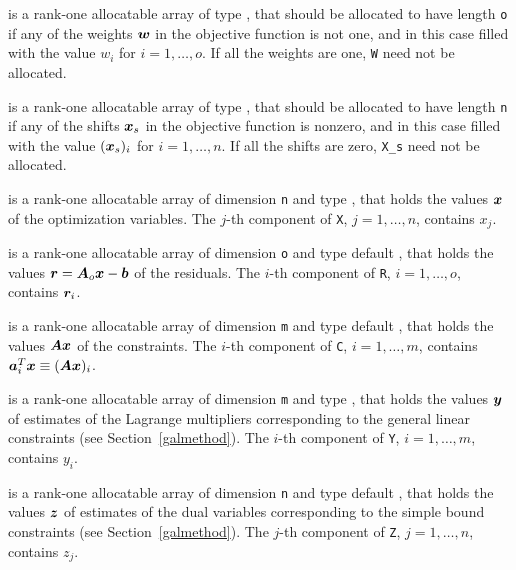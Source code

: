 \documentclass{galahad}
\begin{document}
\begin{description}
 is a rank-one allocatable array of type \realdp, that should
be allocated to have length {\tt o} if any of the weights ${\bm{w}}$
in the objective function is not one, and in this case
filled with the value $w_{i}$ for $i = 1, \ldots , o$.
If all the weights are one, {\tt W} need not be allocated.

 is a rank-one allocatable array of type \realdp, that should
be allocated to have length {\tt n} if any of the shifts ${\bm{x}}_s$
in the objective function is nonzero, and in this case
filled with the value $({\bm{x}}_s)_{i}$ for $i = 1, \ldots , n$.
If all the shifts are zero, {\tt X\_s} need not be allocated.

 is a rank-one allocatable array of dimension {\tt n} and type
\realdp,
that holds the values ${\bm{x}}$ of the optimization variables.
The $j$-th component of {\tt X}, $j = 1,  \ldots , n$, contains $x_{j}$.

 is a rank-one allocatable array of dimension {\tt o} and type default
\realdp, that holds the values ${\bm{r}} = {\bm{A}}_o {\bm{x}} - {\bm{b}}$ of the residuals.
The $i$-th component of {\tt R}, $i = 1,  \ldots , o$, contains ${\bm{r}}_{i}$.

 is a rank-one allocatable array of dimension {\tt m} and type default
\realdp, that holds
the values ${\bm{A}} {\bm{x}}$ of the constraints.
The $i$-th component of {\tt C}, $i = 1,  \ldots ,  m$, contains
${\bm{a}}_{i}^{T}{\bm{x}} \equiv ({\bm{A}} {\bm{x}})_{i}$.

 is a rank-one allocatable array of dimension {\tt m} and type
\realdp, that holds
the values ${\bm{y}}$ of estimates  of the Lagrange multipliers
corresponding to the general linear constraints (see Section~\ref{galmethod}).
The $i$-th component of {\tt Y}, $i = 1,  \ldots ,  m$, contains $y_{i}$.

 is a rank-one allocatable array of dimension {\tt n} and type default
\realdp, that holds the values ${\bm{z}}$ of estimates  of the dual variables
corresponding to the simple bound constraints (see Section~\ref{galmethod}).
The $j$-th component of {\tt Z}, $j = 1,  \ldots ,  n$, contains $z_{j}$.


\end{description}
\end{document}
